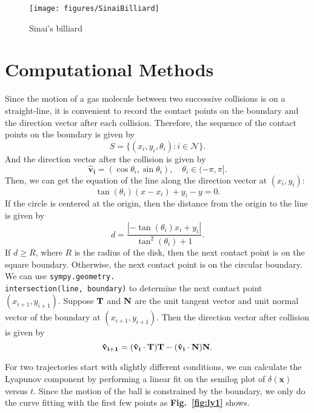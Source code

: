 \documentclass[12pt]{article}
\begin{document}
\begin{figure}[H]
	\centering
	\texttt{[image: figures/SinaiBilliard]}
	\caption{Sinai's billiard}
	\label{fig:1}
\end{figure}


\section*{Computational Methods}
Since the motion of a gas molecule between two successive collisions is on a straight-line, it is convenient to record the contact points on the boundary and the direction vector after each collision. Therefore, the sequence of the contact points on the boundary is given by
\begin{equation}
	S = \{(x_i , y_i, \theta _i) : i\in \mathcal{N} \}.
\end{equation}
And the direction vector after the collision is given by
\begin{equation}
	\mathbf{\hat{v}_{i}} = (\cos{\theta_i}, \sin{\theta_i}), \quad \theta_i \in (-\pi, \pi].
\end{equation}
Then, we can get the equation of the line along the direction vector at $(x_i, y_i)$:
\begin{equation}
	\tan(\theta_i)(x - x_i) + y_i - y = 0.
\end{equation}
If the circle is centered at the origin, then the distance from the origin to the line is given by
\begin{equation}
	d = \frac{|-\tan(\theta_i) x_i + y_i |}{\tan^{2}(\theta_i) + 1}.
\end{equation}
If $d \geq R$, where $R$ is the radius of the disk, then the next contact point is on the square boundary. Otherwise, the next contact point is on the circular boundary. We can use {\tt sympy.geometry.\\intersection(line, boundary)} to determine the next contact point $(x_{i+1}, y_{i+1})$. Suppose $\mathbf{\bf{T}}$ and $\mathbf{\bf{N}}$ are the unit tangent vector and unit normal vector of the boundary at $(x_{i+1}, y_{i+1})$. Then the direction vector after collision is given by
\begin{equation}
	\mathbf{\bf{\hat{v}_{i+1}}} = (\mathbf{\hat{v}_{i}}\cdot\mathbf{\bf{T}})\mathbf{\bf{T}} - (\mathbf{\hat{v}_{i}} \cdot \mathbf{\bf{N}})\mathbf{\bf{N}}.
\end{equation} 


For two trajectories start with slightly different conditions, we can calculate the Lyapunov component by performing a linear fit on the semilog plot of $\delta(\mathbf{x})$ versus $t$. Since the motion of the ball is constrained by the boundary, we only do the curve fitting with the first few points as {\bf Fig.~\ref{fig:ly1}} shows. 
\end{document}
